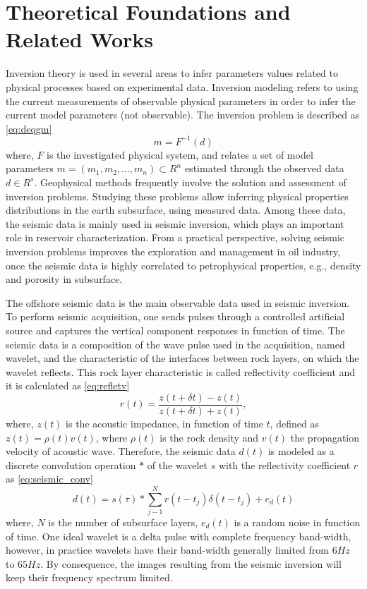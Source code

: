 \documentclass[conference]{IEEEtran}
\begin{document}
\section{Theoretical Foundations and Related Works}
Inversion theory is used in several areas to infer parameters values
related to physical processes based on experimental data.
Inversion modeling refers to using the current measurements of observable
physical parameters in order to infer the current model parameters (not observable).
The inversion problem is described as  \eqref{eq:deqgm}
\begin{equation}
\label{eq:deqgm}
m = F^{-1}(d)
\end{equation}
where, $F$ is the investigated physical system, and relates a set of model parameters
$m=(m_1, m_2,...,m_n)\subset R^n$ estimated through the observed data $d \in R^s$.
Geophysical methods frequently involve the solution and assessment of inversion problems.
Studying these problems allow inferring physical properties distributions in the earth subsurface, using measured
data. Among these data, the seismic data is mainly used in seismic inversion, which plays an important role in
reservoir characterization. From a practical perspective, solving seismic inversion problems improves
the exploration and management in oil industry, once the seismic data is highly correlated to petrophysical
properties, e.g., density and porosity in subsurface.

The offshore seismic data is the main observable data used in seismic inversion. To perform seismic acquisition,
one sends pulses through a controlled artificial source and captures
the vertical component responses in function of time. The seismic data is a composition of
the wave pulse used in the acquisition, named wavelet, and the characteristic of the interfaces between rock layers,
on which the wavelet reflects. This rock layer characteristic is called reflectivity coefficient and it is
calculated as \eqref{eq:refletv}
\begin{equation}
r(t) = \frac{z(t+\delta t)-z(t)}{z(t+\delta t)+z(t)},
\label{eq:refletv}
\end{equation}
where, $z(t)$ is the acoustic impedance, in function of time $t$, defined as 
$z(t)=\rho(t)v(t)$, where $\rho(t)$ is the rock density and $v(t)$ the propagation velocity
of acoustic wave.
Therefore, the seismic data  $d(t)$ is modeled as a discrete convolution operation $*$ of the wavelet $s$ with the
reflectivity coefficient $r$ as \eqref{eq:seismic_conv}
\begin{equation}
d(t) = s(\tau) * \sum_{j-1}^{N}{r(t- t_j) \delta(t - t_j) + e_d(t)}
\label{eq:seismic_conv}
\end{equation}
where, $N$ is the number of subsurface layers, $e_d(t)$ is a random noise in function of time.
One ideal wavelet is a delta pulse with complete frequency band-width, however, in practice
wavelets have their band-width generally limited from $6Hz$ to $65Hz$. By consequence,
the images resulting from the seismic inversion will keep their frequency spectrum limited.
\end{document}

